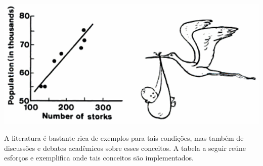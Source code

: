 \documentclass[
]{book}
\begin{document}
\includegraphics{./img/cap_cegonha.png}

A literatura é bastante rica de exemplos para tais condições, mas também de discussões e debates acadêmicos sobre esses conceitos. A tabela a seguir reúne esforços e exemplifica onde tais conceitos são implementados.
\end{document}
